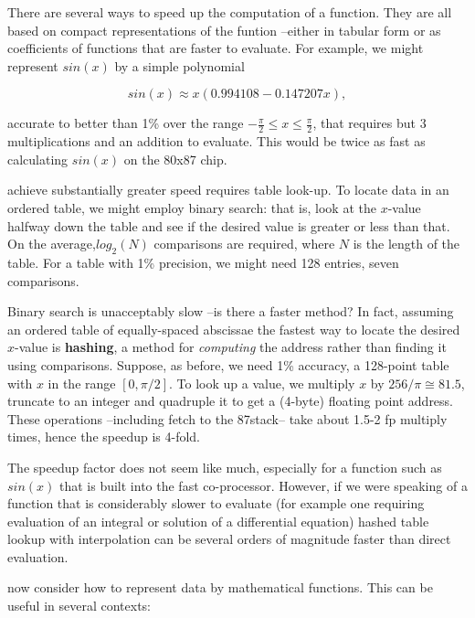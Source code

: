 There are several ways to speed up the computation of a function. They are all based on compact representations of the funtion --either in tabular form or as coefficients of functions that are faster to evaluate. For example, we might represent $sin(x)$ by a simple polynomial

\begin{equation}
sin(x) \approx x \left( 0.994108 - 0.147207x\right),
\end{equation}

accurate to better than 1\% over the range $-\frac{\pi}{2}\leq x \leq \frac{\pi}{2}$, that requires but 3 multiplications and an addition to evaluate. This would be twice as fast as calculating $sin(x)$ on the 80x87 chip.

 achieve substantially greater speed requires table look-up. To locate data in an ordered table, we might employ binary search: that is, look at the $x$-value halfway down the table and see if the desired value is greater or less than that. On the average,$log_{2}(N)$ comparisons are required, where $N$ is the length of the table. For a table with 1\% precision, we might need 128 entries, \ie seven comparisons.

Binary search is unacceptably slow --is there a faster method? In fact, assuming an ordered table of equally-spaced abscissae the fastest way to locate the desired $x$-value is \textbf{hashing}, a method for \textit{computing} the address rather than finding it using comparisons. Suppose, as before, we need 1\% accuracy, \ie a 128-point table with $x$ in the range $[0,\pi/2]$. To look up a value, we multiply $x$ by $256/\pi \cong 81.5$, truncate to an integer and quadruple it to get a (4-byte) floating point address. These operations --including fetch to the 87stack-- take about 1.5-2 fp multiply times, hence the speedup is 4-fold.

The speedup factor does not seem like much, especially for a
function such as $sin(x)$ that is built into the fast co-processor. However, if we were speaking of a function that is considerably slower to evaluate (for example one requiring evaluation of an integral or solution of a differential equation) hashed table lookup with interpolation can be several orders of magnitude faster than direct evaluation.

 now consider how to represent data by mathematical functions. This can be useful in several contexts:

